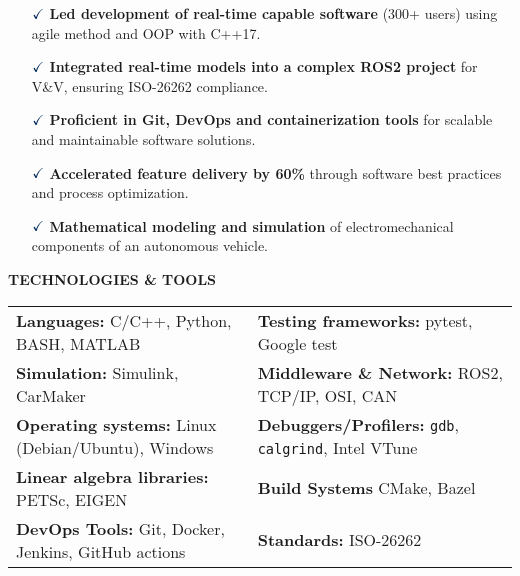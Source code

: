 \documentclass[a4paper,10pt]{article}
\begin{document}
\vspace{0.1cm}
\begin{itemize}
    \item[$\textcolor{highlightcolor}{\checkmark}$] \textcolor{highlightcolor}{\textbf{Led development of real-time capable software}} (300+ users) using agile method and OOP with C++17.
    \item[$\textcolor{highlightcolor}{\checkmark}$] \textcolor{highlightcolor}{\textbf{Integrated real-time models into a complex ROS2 project}} for V\&V, ensuring ISO-26262 compliance.
    \item[$\textcolor{highlightcolor}{\checkmark}$] \textcolor{highlightcolor}{\textbf{Proficient in Git, DevOps and containerization tools}} for scalable and maintainable software solutions.
    \item[$\textcolor{highlightcolor}{\checkmark}$] \textcolor{highlightcolor}{\textbf{Accelerated feature delivery by 60\%}} through software best practices and process optimization.
    \item[$\textcolor{highlightcolor}{\checkmark}$] \textcolor{highlightcolor}{\textbf{Mathematical modeling and simulation}} of electromechanical components of an autonomous vehicle.
\end{itemize}

\noindent{\rule{\linewidth}{1.4pt}}
\textbf{TECHNOLOGIES \& TOOLS}

\vspace{-0.1cm}
\noindent{\rule{\linewidth}{0.01cm}}

\vspace{-0.4cm}
\noindent
\begin{center}
    \begin{tabular}{ @{\hskip 0pt}m{} m{} }
        \textcolor{highlightcolor}{\textbf{Languages:}} C/C++, Python, BASH, MATLAB & \textcolor{highlightcolor}{\textbf{Testing frameworks:}} pytest, Google test \\ 
        \textcolor{highlightcolor}{\textbf{Simulation:}} Simulink, CarMaker & \textcolor{highlightcolor}{\textbf{Middleware \& Network:}} ROS2, TCP/IP, OSI, CAN\\
        \textcolor{highlightcolor}{\textbf{Operating systems:}} Linux (Debian/Ubuntu), Windows & \textcolor{highlightcolor}{\textbf{Debuggers/Profilers:}} \verb|gdb|, \verb|calgrind|, Intel VTune \\
        \textcolor{highlightcolor}{\textbf{Linear algebra libraries:}} PETSc, EIGEN & \textcolor{highlightcolor}{\textbf{Build Systems}} CMake, Bazel\\
        \textcolor{highlightcolor}{\textbf{DevOps Tools:}} Git, Docker, Jenkins, GitHub actions & \textcolor{highlightcolor}{\textbf{Standards:}} ISO-26262 \\
    \end{tabular}
\end{center}
\end{document}
